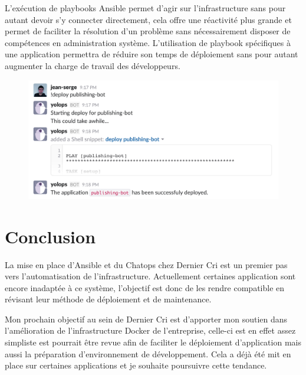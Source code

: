 L'exécution de playbooks Ansible permet d'agir sur l'infrastructure sans
pour autant devoir s'y connecter directement, cela offre une réactivité
plus grande et permet de faciliter la résolution d'un problème sans
nécessairement disposer de compétences en administration système.
L'utilisation de playbook spécifiques à une application permettra de
réduire son temps de déploiement sans pour autant augmenter la charge de
travail des développeurs.

\begin{figure}[htbp]
\centering
\includegraphics{deploy.png}
\caption{}
\end{figure}

\newpage

\section{Conclusion}\label{conclusion}

La mise en place d'Ansible et du Chatops chez Dernier Cri est un premier
pas vers l'automatisation de l'infrastructure. Actuellement certaines
application sont encore inadaptée à ce système, l'objectif est donc de
les rendre compatible en révisant leur méthode de déploiement et de
maintenance.

\bigskip

Mon prochain objectif au sein de Dernier Cri est d'apporter mon soutien
dans l'amélioration de l'infrastructure Docker de l'entreprise, celle-ci
est en effet assez simpliste est pourrait être revue afin de faciliter
le déploiement d'application mais aussi la préparation d'environnement
de développement. Cela a déjà été mit en place sur certaines
applications et je souhaite poursuivre cette tendance.
